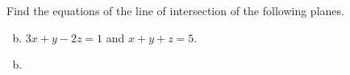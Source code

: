 \documentclass[../main.tex]{subfiles}
\begin{document}
Find the equations of the line of intersection of the following planes.
\begin{enumerate}[a)]
	\setcounter{enumi}{1}
	\item $3x + y - 2z = 1$ and $x + y + z = 5$.
\end{enumerate}

\solution
\begin{enumerate}[a)]
	\setcounter{enumi}{1}
	\item 
\end{enumerate}
\end{document}
